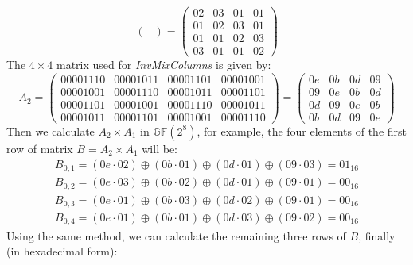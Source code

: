 \documentclass[12pt, a4paper]{article}
\begin{document}
\begin{enumerate}
\begin{enumerate}[a)]
$$\begin{pmatrix}
                  \end{pmatrix} = \begin{pmatrix} 02 & 03 & 01 & 01\\ 01 & 02 & 03 & 01\\ 01 & 01 & 02 & 03\\ 03 & 01 & 01 & 02\end{pmatrix}
                  $$
                  The $4\times 4$ matrix used for \emph{InvMixColumns} is given by:
                  $$A_2 = 
                  \begin{pmatrix}
                        00001110 & 00001011 & 00001101 & 00001001\\
                        00001001 & 00001110 & 00001011 & 00001101\\
                        00001101 & 00001001 & 00001110 & 00001011\\
                        00001011 & 00001101 & 00001001 & 00001110
                  \end{pmatrix} = \begin{pmatrix} 0e & 0b & 0d & 09\\ 09 & 0e & 0b & 0d\\ 0d & 09 & 0e & 0b\\ 0b & 0d & 09 & 0e\end{pmatrix}
                  $$
                  Then we calculate $A_2\times A_1$ in $\mathbb{GF}(2^8)$, for example, the four elements of the first row of 
                  matrix $B = A_2 \times A_1$ will be:
                  \begin{equation*}
                        \begin{split}
                              B_{0,1} = (0e\cdot 02) \oplus (0b\cdot 01) \oplus (0d\cdot 01) \oplus (09\cdot 03) = 01_{16}\\
                              B_{0,2} = (0e\cdot 03) \oplus (0b\cdot 02) \oplus (0d\cdot 01) \oplus (09\cdot 01) = 00_{16}\\
                              B_{0,3} = (0e\cdot 01) \oplus (0b\cdot 03) \oplus (0d\cdot 02) \oplus (09\cdot 01) = 00_{16}\\
                              B_{0,4} = (0e\cdot 01) \oplus (0b\cdot 01) \oplus (0d\cdot 03) \oplus (09\cdot 02) = 00_{16}
                        \end{split}
                  \end{equation*}
                  Using the same method, we can calculate the remaining three rows of $B$, finally (in hexadecimal form):

\end{enumerate}
\end{enumerate}
\end{document}
